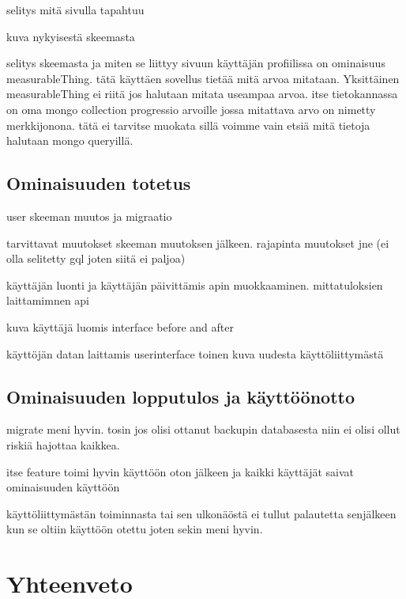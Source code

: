 \documentclass[11pt,a4paper,titlepage,oneside]{article}
\begin{document}
selitys mitä sivulla tapahtuu
\medskip

kuva nykyisestä skeemasta

selitys skeemasta ja miten se liittyy sivuun
käyttäjän profiilissa on ominaisuus measurableThing. tätä käyttäen sovellus tietää mitä arvoa mitataan.
Yksittäinen measurableThing ei riitä jos halutaan mitata useampaa arvoa.
itse tietokannassa on oma mongo collection progressio arvoille jossa mitattava arvo on nimetty merkkijonona.
tätä ei tarvitse muokata sillä voimme vain etsiä mitä tietoja halutaan mongo queryillä.
\medskip



\subsection{Ominaisuuden totetus}

user skeeman muutos ja migraatio


tarvittavat muutokset skeeman muutoksen jälkeen. rajapinta muutokset jne (ei olla selitetty gql joten siitä ei paljoa)


käyttäjän luonti ja käyttäjän päivittämis apin muokkaaminen.
mittatuloksien laittamimnen api

kuva käyttäjä luomis interface before and after


käyttöjän datan laittamis userinterface
toinen kuva uudesta käyttöliittymästä


\subsection{Ominaisuuden lopputulos ja käyttöönotto}
migrate meni hyvin. tosin jos olisi ottanut backupin databasesta niin ei olisi ollut riskiä hajottaa kaikkea.
\medskip

itse feature toimi hyvin käyttöön oton jälkeen ja kaikki käyttäjät saivat ominaisuuden käyttöön
\medskip

käyttöliittymästän toiminnasta tai sen ulkonäöstä ei tullut palautetta senjälkeen kun se oltiin käyttöön otettu joten sekin meni hyvin.
\medskip












\newpage
\section{Yhteenveto}
\end{document}
